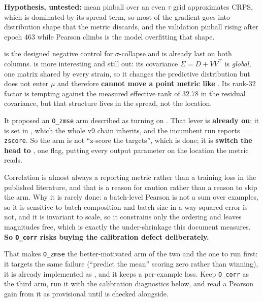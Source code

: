 \textbf{Hypothesis, untested:} mean pinball over an even $\tau$ grid approximates CRPS,
which is dominated by its spread term, so most of the gradient goes into distribution shape
that the metric discards, and the validation pinball rising after epoch 463 while Pearson
climbs is the model overfitting that shape.

  is the designed negative
control for $\sigma$-collapse and is already last on both columns.  is more
interesting and still out: its covariance $\Sigma = D + VV^{\top}$ is \emph{global}, one
matrix shared by every strain, so it changes the predictive distribution but does not enter
$\mu$ and therefore \textbf{cannot move a point metric like }. Its
rank-32 factor is tempting against the measured effective rank of $32.78$ in the residual
covariance, but that structure lives in the spread, not the location.

 It proposed an \texttt{O\_zmse} arm
described as turning on . That lever is
\textbf{already on}: it is set in , which the whole v9 chain inherits, and
the incumbent run reports  $=$ \texttt{zscore}. So the arm is not
``z-score the targets'', which is done; it is \textbf{switch the head to }, one
flag, putting every output parameter on the location the metric reads.

Correlation is almost always a reporting metric rather than a training loss in the published
literature, and that is a reason for caution rather than a reason to skip the arm. Why it is
rarely done: a batch-level Pearson is not a sum over examples, so it is sensitive to batch
composition and batch size in a way squared error is not, and it is invariant to scale, so it
constrains only the ordering and leaves magnitudes free, which is exactly the under-shrinkage
this document measures. \textbf{So \texttt{O\_corr} risks buying the calibration defect
deliberately.}

That makes \texttt{O\_zmse} the better-motivated arm of the two and the one to run first: it
targets the same failure (``predict the mean'' scoring zero rather than winning), it is
already implemented as , and it keeps a
per-example loss. Keep \texttt{O\_corr} as the third arm, run it with the calibration
diagnostics below, and read a Pearson gain from it as provisional until  is
checked alongside.

